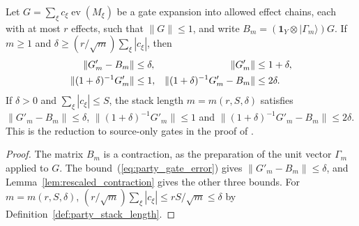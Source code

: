 \begin{theorem}
    \label{thm:party_replace_gate_rescaled}
    \leanok
    Let $G=\sum_\xi c_\xi\operatorname{ev}(M_\xi)$ be a gate expansion into
    allowed effect chains, each with at most $r$ effects, such that
    $\lVert G\rVert\le1$, and write
    $B_m=(\mathbf 1_Y\otimes|\Gamma_m\rangle)G$. If $m\ge1$ and
    $\delta\ge(r/\sqrt m)\sum_\xi|c_\xi|$, then
    \begin{align}
        \lVert G'_m-B_m\rVert               & \le\delta,   &
        \lVert G'_m\rVert                   & \le1+\delta,
        \notag                                               \\
        \lVert(1+\delta)^{-1}G'_m\rVert     & \le1,        &
        \lVert(1+\delta)^{-1}G'_m-B_m\rVert & \le2\delta.
        \notag
    \end{align}
    If $\delta>0$ and $\sum_\xi|c_\xi|\le S$, the stack length
    $m=m(r,S,\delta)$ satisfies $\lVert G'_m-B_m\rVert\le\delta$,
    $\lVert(1+\delta)^{-1}G'_m\rVert\le1$ and
    $\lVert(1+\delta)^{-1}G'_m-B_m\rVert\le2\delta$. This is the reduction
    to source-only gates in the proof of
    \cite[Theorem~5.2]{OpenAI2026PolynomialPEPS}.
\end{theorem}

\begin{proof}\leanok
    The matrix $B_m$ is a contraction, as the preparation of the unit
    vector $\Gamma_m$ applied to $G$. The bound~(\ref{eq:party_gate_error})
    gives $\lVert G'_m-B_m\rVert\le\delta$, and
    Lemma~\ref{lem:rescaled_contraction} gives the other three bounds. For
    $m=m(r,S,\delta)$,
    $(r/\sqrt m)\sum_\xi|c_\xi|\le rS/\sqrt m\le\delta$ by
    Definition~\ref{def:party_stack_length}.
\end{proof}
